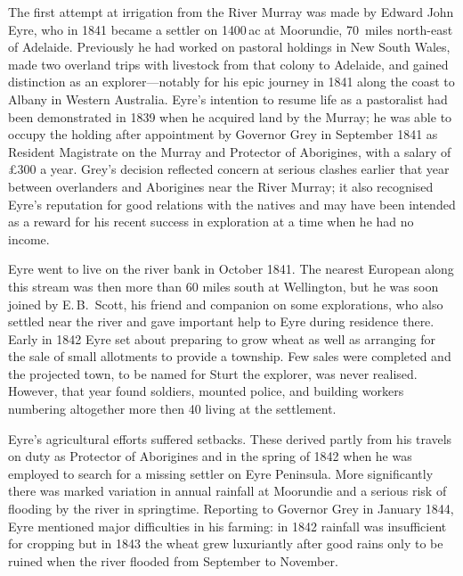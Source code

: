 The first attempt at irrigation from the River Murray was made by
Edward John Eyre, who in 1841 became a settler on 1400\,ac at
Moorundie, 70~miles north-east of Adelaide.  Previously he had worked
on pastoral holdings in New South Wales, made two overland trips with
livestock from that colony to Adelaide, and gained distinction as an
explorer---notably for his epic journey in 1841 along the coast to
Albany in Western Australia.  Eyre's intention to resume life as a
pastoralist had been demonstrated in 1839 when he acquired land by the
Murray; he was able to occupy the holding after appointment by
Governor Grey in September 1841 as Resident Magistrate on the Murray
and Protector of Aborigines, with a salary of \pounds300 a year.
Grey's decision reflected concern at serious clashes earlier that year
between overlanders and Aborigines near the River Murray; it also
recognised Eyre's reputation for good relations with the natives and
may have been intended as a reward for his recent success in
exploration at a time when he had no income.

Eyre went to live on the river bank in October 1841. The nearest
European along this stream was then more than 60 miles south at
Wellington, but he was soon joined by E.\,B.~Scott, his friend and
companion on some explorations, who also settled near the river and
gave important help to Eyre during residence there.  Early in 1842
Eyre set about preparing to grow wheat as well as arranging for the
sale of small allotments to provide a township.  Few sales were
completed and the projected town, to be named for Sturt the explorer,
was never realised.  However, that year found soldiers, mounted
police, and building workers numbering altogether more then 40 living
at the settlement.

Eyre's agricultural efforts suffered setbacks.  These derived partly
from his travels on duty as Protector of Aborigines and in the spring
of 1842 when he was employed to search for a missing settler on Eyre
Peninsula.  More significantly there was marked variation in annual
rainfall at Moorundie and a serious risk of flooding by the river in
springtime.  Reporting to Governor Grey in January 1844, Eyre
mentioned major difficulties in his farming: in 1842 rainfall was
insufficient for cropping but in 1843 the wheat grew luxuriantly after
good rains only to be ruined when the river flooded from September to
November.

